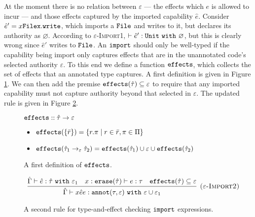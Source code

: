 At the moment there is no relation between $\varepsilon$ --- the effects which $e$ is allowed to incur --- and those effects captured by the imported capability $\hat e$. Consider $\hat e' = {x}{\mathtt{File}}{\mathtt{x.write}}$, which imports a $\mathtt{File}$ and writes to it, but declares its authority as $\varnothing$. According to \textsc{$\varepsilon$-Import1}, $\vdash \hat e': \mathtt{Unit}~\mathtt{with}~ \varnothing$, but this is clearly wrong since $\hat e'$ writes to $\mathtt{File}$. An $\mathtt{import}$ should only be well-typed if the capability being import only captures effects that are in the unannotated code's selected authority $\varepsilon$. To this end we define a function $\mathtt{effects}$, which collects the set of effects that an annotated type captures. A first definition is given in Figure \ref{fig:fx_defn}. We can then add the premise $\mathtt{effects}(\hat \tau) \subseteq \varepsilon$ to require that any imported capability must not capture authority beyond that selected in $\varepsilon$. The updated rule is given in Figure \ref{fig:import_rule_2}.

\begin{figure}[h]

$\mathtt{effects} :: \hat \tau \rightarrow \varepsilon$
\begin{itemize}
	\setlength\itemsep{-0.2em}
	\item[] $\mathtt{effects}(\{ \bar r \}) = \{ r.\pi \mid r \in \bar r, \pi \in \Pi \}$
	\item[] $\mathtt{effects}(\hat \tau_1 \rightarrow_{\varepsilon} \hat \tau_2) = \mathtt{effects}(\hat \tau_1) \cup \varepsilon \cup \mathtt{effects}(\hat \tau_2)$
\end{itemize}
\vspace{-7pt}
\caption{A first definition of $\mathtt{effects}$.}
\label{fig:fx_defn}
\end{figure}

\begin{figure}[h]

\[
\begin{array}{c}

\infer[\textsc{($\varepsilon$-Import2)}]
	{ \hat \Gamma \vdash {x}{\hat e}{e}: \kwa{annot}(\tau, \varepsilon)~\kw{with} \varepsilon \cup \varepsilon_1 }
	{ \hat \Gamma \vdash \hat e: \hat \tau~\kw{with} \varepsilon_1 & x: \kwa{erase}(\hat \tau) \vdash e: \tau & \kwa{effects}(\hat \tau) \subseteq \varepsilon}

\end{array}
\]
\vspace{-7pt}
\caption{A second rule for type-and-effect checking $\mathtt{import}$ expressions.}
\label{fig:import_rule_2}
\end{figure}

